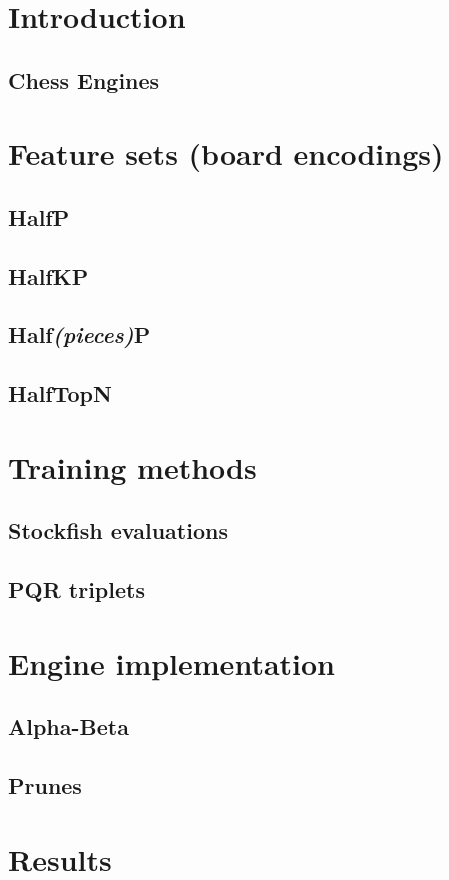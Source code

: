 \documentclass[10pt,a4paper]{article}
\begin{document}
\maketitle
\newpage

\tableofcontents
\newpage

\section{Introduction}
\subsection{Chess Engines}

\section{Feature sets (board encodings)}
\subsection{HalfP}
\subsection{HalfKP}
\subsection{Half\textit{(pieces)}P}
\subsection{HalfTopN}



\section{Training methods}
\subsection{Stockfish evaluations}
\subsection{PQR triplets}

\section{Engine implementation}
\subsection{Alpha-Beta}
\subsection{Prunes}

\section{Results}
\end{document}
